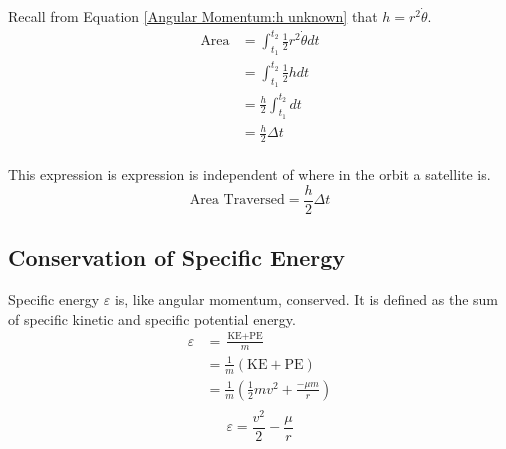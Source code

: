 \documentclass{article}
\begin{document}
Recall from Equation \eqref{Angular Momentum:h unknown} that $h=r^2\dot{\theta}$.
\begin{align*}
    \text{Area} & = \int_{t_1}^{t_2}\frac{1}{2}r^2\dot{\theta}dt \\
                & = \int_{t_1}^{t_2}\frac{1}{2}hdt               \\
                & = \frac{h}{2}\int_{t_1}^{t_2}dt                \\
                & = \frac{h}{2}\Delta{}t                         \\
\end{align*}

This expression is expression is independent of where in the orbit a satellite is.
\begin{equation}\label{Kepler's First Law}
    \text{Area Traversed} = \frac{h}{2}\Delta{}t
\end{equation}

\bigskip\bigskip
\subsection{Conservation of Specific Energy}\label{sec:Conservation of Energy}

Specific energy $\varepsilon$ is, like angular momentum, conserved. It is defined as the sum of specific kinetic and specific potential energy.
\begin{align*}
    \varepsilon & =\frac{\text{KE}+\text{PE}}{m}                             \\
                & =\frac{1}{m}(\text{KE}+\text{PE})                          \\
                & =\frac{1}{m}\left(\frac{1}{2}mv^2+\frac{-\mu{}m}{r}\right) \\
\end{align*}
\begin{equation}\label{Specific Energy Physical}
    \varepsilon=\frac{v^2}{2}-\frac{\mu{}}{r}
\end{equation}
\end{document}
